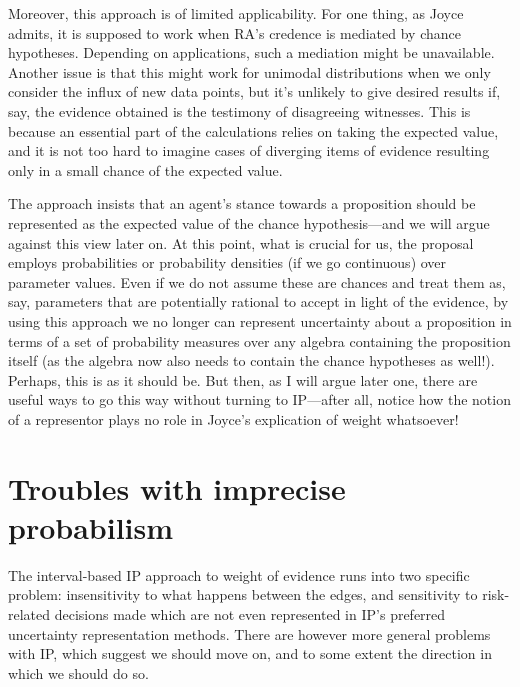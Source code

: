 \documentclass[
  10pt,
  dvipsnames,enabledeprecatedfontcommands]{scrartcl}
\begin{document}
Moreover, this approach is of limited applicability. For one thing, as
Joyce admits, it is supposed to work when RA's credence is mediated by
chance hypotheses. Depending on applications, such a mediation might be
unavailable. Another issue is that this might work for unimodal
distributions when we only consider the influx of new data points, but
it's unlikely to give desired results if, say, the evidence obtained is
the testimony of disagreeing witnesses. This is because an essential
part of the calculations relies on taking the expected value, and it is
not too hard to imagine cases of diverging items of evidence resulting
only in a small chance of the expected value.

The approach insists that an agent's stance towards a proposition should
be represented as the expected value of the chance hypothesis---and we
will argue against this view later on. At this point, what is crucial
for us, the proposal employs probabilities or probability densities (if
we go continuous) over parameter values. Even if we do not assume these
are chances and treat them as, say, parameters that are potentially
rational to accept in light of the evidence, by using this approach we
no longer can represent uncertainty about a proposition in terms of a
set of probability measures over any algebra containing the proposition
itself (as the algebra now also needs to contain the chance hypotheses
as well!). Perhaps, this is as it should be. But then, as I will argue
later one, there are useful ways to go this way without turning to
IP---after all, notice how the notion of a representor plays no role in
Joyce's explication of weight whatsoever!

\hypertarget{troubles-with-imprecise-probabilism}{%
\section{Troubles with imprecise
probabilism}\label{troubles-with-imprecise-probabilism}}

The interval-based \textsf{IP} approach to weight of evidence runs into
two specific problem: insensitivity to what happens between the edges,
and sensitivity to risk-related decisions made which are not even
represented in \textsf{IP}'s preferred uncertainty representation
methods. There are however more general problems with \textsf{IP}, which
suggest we should move on, and to some extent the direction in which we
should do so.
\end{document}
